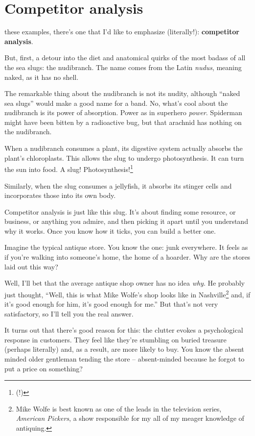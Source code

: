 \section{Competitor analysis}

 these examples, there's one that I'd like to emphasize
(literally!): \textbf{competitor analysis}.

But, first, a detour into the diet and anatomical quirks of the most badass of
all the sea slugs: the nudibranch. The name comes from the Latin \textit{nudus},
meaning naked, as it has no shell.

The remarkable thing about the nudibranch is not its nudity, although ``naked sea
slugs'' would make a good name for a band. No, what's cool about the nudibranch
is its power of absorption. Power as in superhero \textit{power}. Spiderman might have been bitten by a radioactive
bug, but that arachnid has nothing on the nudibranch.

When a nudibranch consumes a plant, its digestive system actually
absorbs the plant's chloroplasts. This allows the slug to undergo
photosynthesis. It can turn the sun into food. A slug! Photosynthesis!\footnote{(!)}

Similarly, when the slug consumes a jellyfish, it absorbs its stinger cells and
incorporates those into its own body.

Competitor analysis is just like this slug. It's about finding some resource, or
business, or anything you admire, and then picking it apart until you understand
why it works. Once you know how it ticks, you can build a better one.

Imagine the typical antique store. You know the one: junk everywhere. It feels
as if you're walking into someone's home, the home of a hoarder. Why are the
stores laid out this way?

Well, I'll bet that the average antique shop owner has no idea \textit{why}. He
probably just thought, ``Well, this is what Mike Wolfe's shop looks like in
Nashville\footnote{Mike Wolfe is best known as one of the leads in the television series, \textit{American Pickers}, a show responsible for my all of my meager knowledge of antiquing.} and, if it's good enough for him, it's good enough for me.'' But that's
not very satisfactory, so I'll tell you the real answer. 

It turns out that there's good reason for this: the clutter evokes a
psychological response in customers. They feel like they're stumbling on buried
treasure (perhaps literally) and, as a result, are more likely to buy. You know
the absent minded older gentleman tending the store -- absent-minded because he forgot to put a price
on something?

